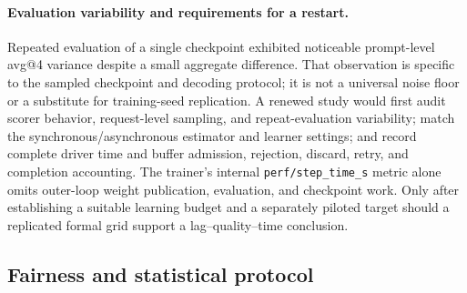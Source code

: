 \documentclass[10pt]{article}
\begin{document}
\paragraph{Evaluation variability and requirements for a restart.}
Repeated evaluation of a single checkpoint exhibited noticeable prompt-level avg@4 variance despite a small aggregate difference.
That observation is specific to the sampled checkpoint and decoding protocol; it is not a universal noise floor or a substitute for training-seed replication.
A renewed study would first audit scorer behavior, request-level sampling, and repeat-evaluation variability; match the synchronous/asynchronous estimator and learner settings; and record complete driver time and buffer admission, rejection, discard, retry, and completion accounting.
The trainer's internal \texttt{perf/step\_time\_s} metric alone omits outer-loop weight publication, evaluation, and checkpoint work.
Only after establishing a suitable learning budget and a separately piloted target should a replicated formal grid support a lag--quality--time conclusion.

\subsection{Fairness and statistical protocol}
\end{document}
